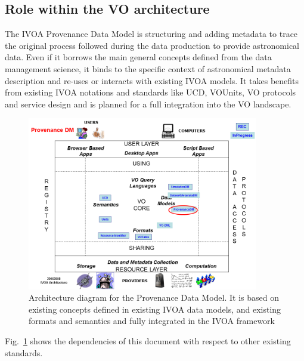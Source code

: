 \subsection{Role within the VO architecture}

The IVOA Provenance Data Model is structuring and adding metadata to trace the original process followed during the data production to provide astronomical data. Even if it borrows the main general concepts defined from the data management science, it binds to the specific context of astronomical metadata description and re-uses or interacts with existing IVOA models.
It takes benefits from existing IVOA notations and standards like UCD, VOUnits, VO protocols and service design and is planned for a full integration into the VO landscape.

\begin{figure}
\centering
\includegraphics[width=0.9\textwidth]{VOArchitecture-Prov2016.png}
\caption[Architecture diagram for the Provenance Data Model]{Architecture diagram for the Provenance Data Model. It is based on existing concepts defined in existing IVOA data models, and existing formats and semantics and fully integrated in the IVOA framework}
\label{fig:archdiag}
\end{figure}

Fig.~\ref{fig:archdiag} shows the dependencies of this document with respect to other existing standards.
